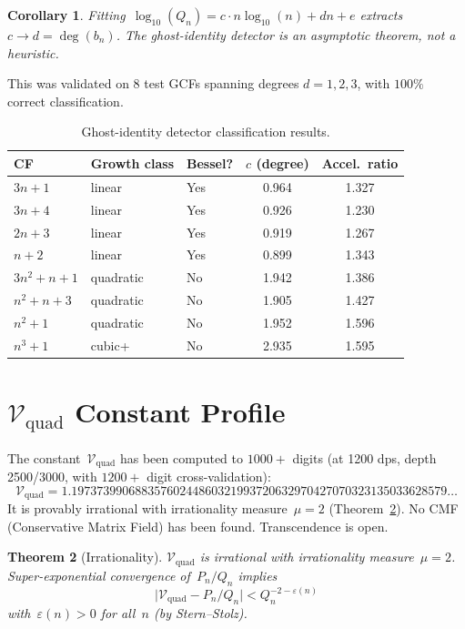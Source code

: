 \documentclass[11pt,a4paper]{article}
\newtheorem{theorem}{Theorem}
\newtheorem{corollary}[theorem]{Corollary}
\begin{document}
\begin{corollary}
Fitting~$\log_{10}(Q_n) = c\cdot n\log_{10}(n) + dn + e$ extracts~$c \to d = \deg(b_n)$. The ghost-identity detector is an asymptotic theorem, not a heuristic.
\end{corollary}

This was validated on 8 test GCFs spanning degrees $d = 1, 2, 3$, with $100\%$ correct classification.

\begin{table}[ht]
\centering
\caption{Ghost-identity detector classification results.}
\label{tab:detector}
\begin{tabular}{@{}lllcc@{}}
\toprule
CF & Growth class & Bessel? & $c$ (degree) & Accel.\ ratio \\
\midrule
$3n+1$       & linear    & Yes & 0.964 & 1.327 \\
$3n+4$       & linear    & Yes & 0.926 & 1.230 \\
$2n+3$       & linear    & Yes & 0.919 & 1.267 \\
$n+2$        & linear    & Yes & 0.899 & 1.343 \\
$3n^2+n+1$   & quadratic & No  & 1.942 & 1.386 \\
$n^2+n+3$    & quadratic & No  & 1.905 & 1.427 \\
$n^2+1$      & quadratic & No  & 1.952 & 1.596 \\
$n^3+1$      & cubic+    & No  & 2.935 & 1.595 \\
\bottomrule
\end{tabular}
\end{table}

\section{\texorpdfstring{$\mathcal{V}_{\mathrm{quad}}$}{V\_quad} Constant Profile}\label{sec:vquad_profile}

The constant~$\mathcal{V}_{\mathrm{quad}}$ has been computed to $1000{+}$ digits (at 1200 dps, depth 2500/3000, with $1200{+}$ digit cross-validation):
\[
  \mathcal{V}_{\mathrm{quad}} = 1.19737399068835760244860321993720632970427070323135033628579\ldots
\]
It is provably irrational with irrationality measure~$\mu = 2$ (Theorem~\ref{thm:irrat}). No CMF (Conservative Matrix Field) has been found. Transcendence is open.

\begin{theorem}[Irrationality]\label{thm:irrat}
$\mathcal{V}_{\mathrm{quad}}$ is irrational with irrationality measure~$\mu = 2$. Super-exponential convergence of~$P_n/Q_n$ implies
\[
  \bigl|\mathcal{V}_{\mathrm{quad}} - P_n/Q_n\bigr| < Q_n^{-2-\varepsilon(n)}
\]
with~$\varepsilon(n) > 0$ for all~$n$ (by Stern--Stolz).
\end{theorem}
\end{document}
